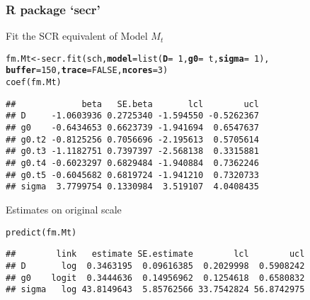 \documentclass[color=usenames,dvipsnames]{beamer}\usepackage[]{graphicx}\usepackage[]{xcolor}
\makeatletter
\newcommand{\hlnum}[1]{\textcolor[rgb]{0.69,0.494,0}{#1}}%
\newcommand{\hlopt}[1]{\textcolor[rgb]{0,0,0}{#1}}%
\newcommand{\hldef}[1]{\textcolor[rgb]{0,0,0}{#1}}%
\newcommand{\hlkwb}[1]{\textcolor[rgb]{0,0.341,0.682}{#1}}%
\newcommand{\hlkwc}[1]{\textcolor[rgb]{0,0,0}{\textbf{#1}}}%
\newcommand{\hlkwd}[1]{\textcolor[rgb]{0.004,0.004,0.506}{#1}}%
\newenvironment{kframe}{%
 \def\at@end@of@kframe{}%
 \ifinner\ifhmode%
  \def\at@end@of@kframe{\end{minipage}}%
  \begin{minipage}{\columnwidth}%
 \fi\fi%
 \def\FrameCommand##1{\hskip\@totalleftmargin \hskip-\fboxsep
 \colorbox{shadecolor}{##1}\hskip-\fboxsep
     \hskip-\linewidth \hskip-\@totalleftmargin \hskip\columnwidth}%
 \MakeFramed {\advance\hsize-\width
   \@totalleftmargin\z@ \linewidth\hsize
   \@setminipage}}%
 {\par\unskip\endMakeFramed%
 \at@end@of@kframe}
\newenvironment{knitrout}{}{} %
\let\hlstd\hldef
\makeatother
\begin{document}
\begin{frame}[fragile]
  \frametitle{R package `secr'}
  Fit the SCR equivalent of Model $M_t$
\begin{knitrout}\scriptsize
{}\color{fgcolor}\begin{kframe}
\begin{alltt}
\hlstd{fm.Mt} \hlkwb{<-} \hlkwd{secr.fit}\hlstd{(sch,} \hlkwc{model}\hlstd{=}\hlkwd{list}\hlstd{(}\hlkwc{D}\hlstd{=}\hlopt{~}\hlnum{1}\hlstd{,} \hlkwc{g0}\hlstd{=}\hlopt{~}\hlstd{t,} \hlkwc{sigma}\hlstd{=}\hlopt{~}\hlnum{1}\hlstd{),}
                  \hlkwc{buffer}\hlstd{=}\hlnum{150}\hlstd{,} \hlkwc{trace}\hlstd{=}\hlnum{FALSE}\hlstd{,} \hlkwc{ncores}\hlstd{=}\hlnum{3}\hlstd{)}
\hlkwd{coef}\hlstd{(fm.Mt)}
\end{alltt}
\begin{verbatim}
##             beta   SE.beta       lcl        ucl
## D     -1.0603936 0.2725340 -1.594550 -0.5262367
## g0    -0.6434653 0.6623739 -1.941694  0.6547637
## g0.t2 -0.8125256 0.7056696 -2.195613  0.5705614
## g0.t3 -1.1182751 0.7397397 -2.568138  0.3315881
## g0.t4 -0.6023297 0.6829484 -1.940884  0.7362246
## g0.t5 -0.6045682 0.6819724 -1.941210  0.7320733
## sigma  3.7799754 0.1330984  3.519107  4.0408435
\end{verbatim}
\end{kframe}
\end{knitrout}
\pause
\vfill
Estimates on original scale
\begin{knitrout}\scriptsize
{}\color{fgcolor}\begin{kframe}
\begin{alltt}
\hlkwd{predict}\hlstd{(fm.Mt)}
\end{alltt}
\begin{verbatim}
##        link   estimate SE.estimate        lcl        ucl
## D       log  0.3463195  0.09616385  0.2029998  0.5908242
## g0    logit  0.3444636  0.14956962  0.1254618  0.6580832
## sigma   log 43.8149643  5.85762566 33.7542824 56.8742975
\end{verbatim}
\end{kframe}
\end{knitrout}
\end{frame}
\end{document}
